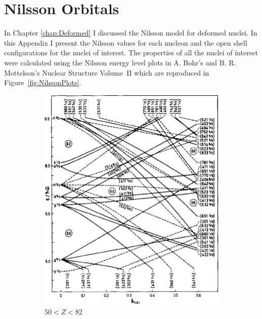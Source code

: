 \documentclass[10pt,a4paper, twoside, openright]{report}
\begin{document}
\chapter{Nilsson Orbitals} \label{chap:Nilsson}
In Chapter \ref{chap:Deformed} I discussed the Nilsson model for deformed nuclei. In this Appendix I present the Nilsson values for each nucleon and the open shell configurations for the nuclei of interest. The properties of all the nuclei of interest were calculated using the Nilsson energy level plots in A. Bohr's and B. R. Mottelson's Nuclear Structure Volume~II \cite{BohrMottVol2} which are reproduced in Figure~\ref{fig:NilssonPlots}. 
\begin{figure}
\centering
\begin{subfigure}[b]{0.45\textwidth}
    \includegraphics[width=\textwidth]{./figures/Nilsson/proton_deformed50.png}
    \caption{$50<Z<82$}
\end{subfigure}	
\quad
\begin{subfigure}[b]{0.45\textwidth}

\end{subfigure}
\end{figure}
\end{document}
